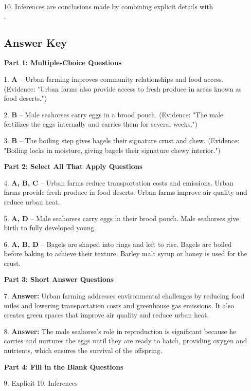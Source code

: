 \documentclass[12pt]{article}
\begin{document}
10. Inferences are conclusions made by combining explicit details with\\ \underline{\hspace{4cm}}.  
\vspace{2cm}
\newpage
\subsection*{Answer Key}

\textbf{Part 1: Multiple-Choice Questions}

1. \textbf{A} – Urban farming improves community relationships and food access.  
(Evidence: "Urban farms also provide access to fresh produce in areas known as food deserts.")

2. \textbf{B} – Male seahorses carry eggs in a brood pouch.  
(Evidence: "The male fertilizes the eggs internally and carries them for several weeks.")

3. \textbf{B} – The boiling step gives bagels their signature crust and chew.  
(Evidence: "Boiling locks in moisture, giving bagels their signature chewy interior.")

\textbf{Part 2: Select All That Apply Questions}

4. \textbf{A, B, C} – Urban farms reduce transportation costs and emissions.  
Urban farms provide fresh produce in food deserts.  
Urban farms improve air quality and reduce urban heat.

5. \textbf{A, D} – Male seahorses carry eggs in their brood pouch.  
Male seahorses give birth to fully developed young.

6. \textbf{A, B, D} – Bagels are shaped into rings and left to rise.  
Bagels are boiled before baking to achieve their texture.  
Barley malt syrup or honey is used for the crust.

\textbf{Part 3: Short Answer Questions}

7. \textbf{Answer:} Urban farming addresses environmental challenges by reducing food miles and lowering transportation costs and greenhouse gas emissions. It also creates green spaces that improve air quality and reduce urban heat.

8. \textbf{Answer:} The male seahorse’s role in reproduction is significant because he carries and nurtures the eggs until they are ready to hatch, providing oxygen and nutrients, which ensures the survival of the offspring.

\textbf{Part 4: Fill in the Blank Questions}

9. Explicit  
10. Inferences  
\end{document}
